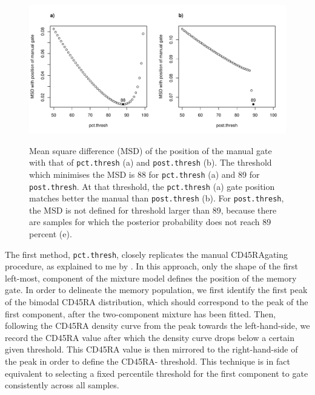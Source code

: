 \begin{figure}[h]
\centering
\begin{minipage}{.6\textwidth}
  \includegraphics[width=\textwidth]{figures/cd45ra-gate-agreement.pdf}
\end{minipage}
{ Mean square difference (MSD) of the position of the manual gate with that of \texttt{pct.thresh} (a) and \texttt{post.thresh} (b). }
{
  The threshold which minimises the MSD is 88 for \texttt{pct.thresh} (a) and 89 for \texttt{post.thresh}.
  At that threshold, the \texttt{pct.thresh} (a) gate position matches better the manual than \texttt{post.thresh} (b).
  For \texttt{post.thresh}, the MSD is not defined for threshold larger than 89,
  because there are samples for which the posterior probability does not reach 89 percent (e).
}
\end{figure}


The first method, \texttt{pct.thresh}, closely replicates the manual CD45RA\negative gating procedure, as explained to me by .
In this approach, only the shape of the first left-most, component of the mixture model defines the position of the \negative memory gate.
In order to delineate the memory population, we first identify the first peak of the bimodal CD45RA distribution,
which should correspond to the peak of the first component, after the two-component mixture has been fitted.
Then, following the CD45RA density curve from the peak towards the left-hand-side,
we record the CD45RA value after which the density curve drops below a certain given threshold.
This CD45RA value is then mirrored to the right-hand-side of the peak in order to define the CD45RA- threshold.
This technique is in fact equivalent to selecting a fixed percentile threshold
for the first component to gate consistently across all samples.

